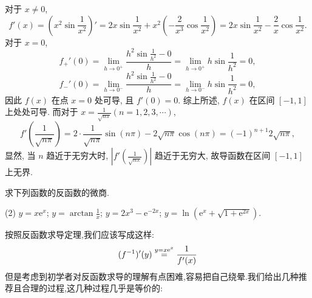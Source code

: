 \begin{solution}
    对于 $x \ne 0$, $$f'(x) = (x^2 \sin \frac{1}{x^2})' = 2x \sin \frac{1}{x^2} + x^2 \left( -\frac{2}{x^3} \cos \frac{1}{x^2} \right) = 2x \sin \frac{1}{x^2} - \frac{2}{x} \cos \frac{1}{x^2}.$$
    对于 $x=0$, $$f_+'(0) = \lim_{h \to 0^+} \frac{h^2 \sin \frac{1}{h^2} - 0}{h} = \lim_{h \to 0^+} h \sin \frac{1}{h^2} = 0,$$
    $$f_-'(0) = \lim_{h \to 0^-} \frac{h^2 \sin \frac{1}{h^2} - 0}{h} = \lim_{h \to 0^-} h \sin \frac{1}{h^2} = 0,$$
    因此 $f(x)$ 在点 $x=0$ 处可导, 且 $f'(0) = 0$. 综上所述, $f(x)$ 在区间 $[-1,1]$ 上处处可导. 而对于 $x=\frac{1}{\sqrt{n\pi}} (n=1,2,3,\cdots)$, $$f'\left( \frac{1}{\sqrt{n\pi}} \right) = 2\cdot\frac{1}{\sqrt{n\pi}} \sin(n\pi) - 2\sqrt{n\pi} \cos(n\pi) = (-1)^{n+1} 2\sqrt{n\pi},$$
    显然, 当 $n$ 趋近于无穷大时, $\left|f' \left(\frac{1}{\sqrt{n\pi}} \right)\right|$ 趋近于无穷大, 故导函数在区间 $[-1,1]$ 上无界.
\end{solution}

\begin{exercise}[3.1.14]
    求下列函数的反函数的微商.
    \begin{tasks}[label=(\arabic*)](2)
        \task $y = x\mathrm{e}^x$;
        \task $y = \arctan\frac{1}{x}$;
        \task $y = 2x^3 - \mathrm{e}^{-2x}$;
        \task $y = \ln(\mathrm{e}^x+\sqrt{1+\mathrm{e}^{2x}})$.
    \end{tasks}
\end{exercise}

按照反函数求导定理,我们应该写成这样:
$$(f^{-1})' (y) \overset{y=x \mathrm{e}^x}{=} \frac{1}{f'(x)}$$
但是考虑到初学者对反函数求导的理解有点困难,容易把自己绕晕.我们给出几种推荐且合理的过程,这几种过程几乎是等价的:

